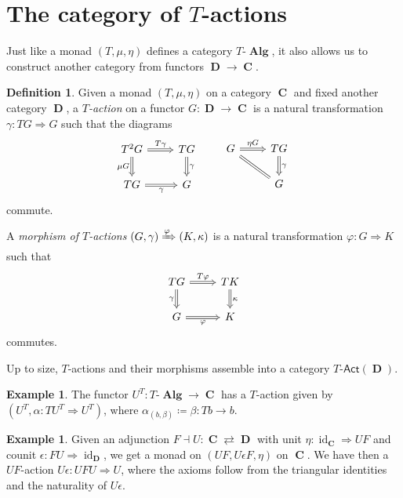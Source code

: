 \documentclass[a4paper,11pt,fullpage,oneside,openany]{amsbook}
\DeclareMathOperator{\Alg}{\mathbf{Alg}}
\DeclareMathOperator{\C}{\mathbf{C}}
\DeclareMathOperator{\D}{\mathbf{D}}
\DeclareMathOperator{\id}{id}
\theoremstyle{definition}
\theoremstyle{definition}
\newtheorem{defn}[thm]{Definition} %
\newtheorem{exmp}[thm]{Example} %
\theoremstyle{remark}
\begin{document}
\section{The category of $T$-actions}

Just like a monad $(T,\mu,\eta)$ defines a category $T\mbox{-}\Alg$, it also allows us to construct another category from functors $\D\rightarrow\C$.

\begin{defn}
	Given a monad $(T,\mu,\eta)$ on a category $\C$ and fixed another category $\D$, a \emph{$T$-action} on a functor $G\colon\D\to\C$ is a natural transformation $\gamma\colon TG\Rightarrow G$ such that the diagrams
	\[
		\begin{tikzcd}
			T^2G\ar["\mu G"', Rightarrow]{d}\ar["T\gamma", 	Rightarrow]{r}
			& TG\ar["\gamma", Rightarrow]{d} \\
			TG\ar["\gamma"', Rightarrow]{r}
			& G
		\end{tikzcd}
		\quad\quad
		\begin{tikzcd}
			G\ar["\eta G", Rightarrow]{r}\ar[equal]{dr}
			& TG\ar["\gamma", Rightarrow]{d}\\
			& G
		\end{tikzcd}
	\]
		commute.
	
		A \emph{morphism of $T$-actions} $(G,\gamma)\xRightarrow{\varphi}(K,\kappa)$ is a natural transformation $\varphi\colon G\Rightarrow K$ such that
\[
\begin{tikzcd}
	TG\ar["T\varphi", Rightarrow]{r}\ar["\gamma"', Rightarrow]{d}
		& TK\ar["\kappa", Rightarrow]{d}\\
		G\ar[r, Rightarrow, "\varphi"']& K 
		\end{tikzcd}
		\]
		commutes.
	
		Up to size, $T$-actions and their morphisms assemble into a category $T\mbox{-}\mathsf{Act}(\D)$.
	\end{defn}

	

\begin{exmp}
	The functor $U^T\colon T\mbox{-}\Alg\rightarrow\C$ has a $T$-action given by $(U^T,\alpha\colon TU^T\Rightarrow U^T)$, where $\alpha_{(b,\beta)}\coloneqq\beta\colon Tb\rightarrow b$.
\end{exmp}

\begin{exmp}
	Given an adjunction  $F\dashv U\colon\C\rightleftarrows\D$ with unit $\eta\colon\id_{\C}\Rightarrow UF$ and counit $\epsilon\colon FU\Rightarrow\id_{\D}$, we get a monad on $(UF,U\epsilon F,\eta)$ on $\C$. We have then a $UF$-action $U\epsilon\colon UFU\Rightarrow U$, where the axioms follow from the triangular identities and the naturality of $U\epsilon$.
\end{exmp}
\end{document}
